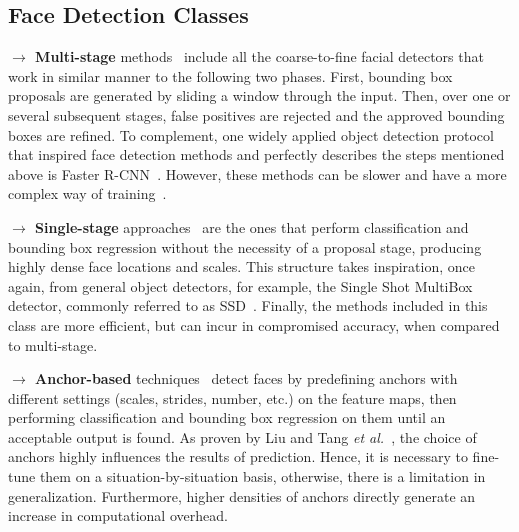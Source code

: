 \documentclass[class=report, crop=false, a4paper, 12pt]{standalone}
\begin{document}
\begin{appendix}

\chapter{Face Detection Classes}\label{appendix:face_detection_appendix}

\noindent\textbf{$\rightarrow$ Multi-stage} methods~\autocite{dengRetinaFaceSinglestageDense2019} include all the coarse-to-fine facial detectors that work in similar manner to the following two phases. First, bounding box proposals are generated by sliding a window through the input. Then, over one or several subsequent stages, false positives are rejected and the approved bounding boxes are refined. To complement, one widely applied object detection protocol that inspired face detection methods and perfectly describes the steps mentioned above is Faster R-CNN~\autocite{renFasterRCNNRealTime2016}. However, these methods can be slower and have a more complex way of training~\autocite{xuCenterFaceJointFace2019}.

\vspace{0.7\baselineskip}
\noindent\textbf{$\rightarrow$ Single-stage} approaches~\autocite{dengRetinaFaceSinglestageDense2019} are the ones that perform classification and bounding box regression without the necessity of a proposal stage, producing highly dense face locations and scales. This structure takes inspiration, once again, from general object detectors, for example, the Single Shot MultiBox detector, commonly referred to as SSD~\autocite{liuSSDSingleShot2016}. Finally, the methods included in this class are more efficient, but can incur in compromised accuracy, when compared to multi-stage.

\vspace{0.7\baselineskip}
\noindent\textbf{$\rightarrow$ Anchor-based} techniques~\autocite{liuHAMBoxDelvingOnline2019, dengRetinaFaceSinglestageDense2019, zhangFaceDetectionUsing2018} detect faces by predefining anchors with different settings (scales, strides, number, etc.) on the feature maps, then performing classification and bounding box regression on them until an acceptable output is found. As proven by Liu and Tang \textit{et al.}~\autocite{liuHAMBoxDelvingOnline2019}, the choice of anchors highly influences the results of prediction. Hence, it is necessary to fine-tune them on a situation-by-situation basis, otherwise, there is a limitation in generalization. Furthermore, higher densities of anchors directly generate an increase in computational overhead.


\end{appendix}
\end{document}
